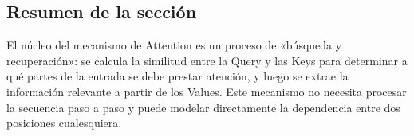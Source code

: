 \subsection{Resumen de la sección}

El núcleo del mecanismo de Attention es un proceso de «búsqueda y recuperación»: se calcula la similitud entre la Query y las Keys para determinar a qué partes de la entrada se debe prestar atención, y luego se extrae la información relevante a partir de los Values. Este mecanismo no necesita procesar la secuencia paso a paso y puede modelar directamente la dependencia entre dos posiciones cualesquiera.

\newpage
